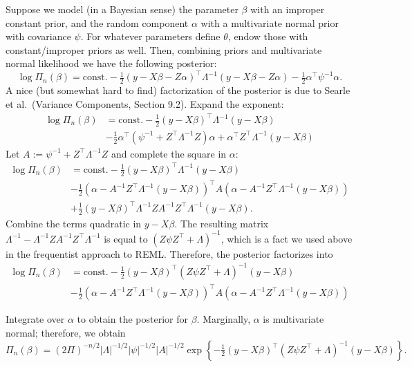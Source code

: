 \documentclass[
]{book}
\begin{document}
Suppose we model (in a Bayesian sense) the parameter \(\beta\) with an improper constant prior, and the random component \(\alpha\) with a multivariate normal prior with covariance \(\psi\). For whatever parameters define \(\theta\), endow those with constant/improper priors as well. Then, combining priors and multivariate normal likelihood we have the following posterior:
\[\log\Pi_n(\beta) = \text{const.} - \tfrac12 \left(y - X\beta - Z\alpha\right)^\top \Lambda^{-1}\left(y - X\beta - Z\alpha\right) - \tfrac12\alpha^\top \psi^{-1}\alpha . \]
A nice (but somewhat hard to find) factorization of the posterior is due to Searle et al.~(Variance Components, Section 9.2). Expand the exponent:
\begin{align*}
\log\Pi_n(\beta) &= \text{const.} - \tfrac12 \left(y - X\beta\right)^\top \Lambda^{-1}\left(y - X\beta\right)\\
&-\tfrac12 \alpha^\top (\psi^{-1} + Z^\top \Lambda^{-1}Z)\alpha + \alpha^\top Z^\top \Lambda^{-1}(y - X\beta)
\end{align*}
Let \(A:=\psi^{-1} + Z^\top \Lambda^{-1}Z\) and complete the square in \(\alpha\):
\begin{align*}
\log\Pi_n(\beta) &= \text{const.} - \tfrac12 \left(y - X\beta\right)^\top \Lambda^{-1}\left(y - X\beta\right)\\
&-\tfrac12(\alpha - A^{-1}Z^\top\Lambda^{-1}(y-X\beta))^\top A(\alpha - A^{-1}Z^\top\Lambda^{-1}(y-X\beta))\\
&+\tfrac12(y-X\beta)^\top\Lambda^{-1}ZA^{-1}Z^\top \Lambda^{-1} (y-X\beta). 
\end{align*}
Combine the terms quadratic in \(y-X\beta\). The resulting matrix \(\Lambda^{-1} - \Lambda^{-1}ZA^{-1}Z^\top \Lambda^{-1}\) is equal to \((Z\psi Z^\top + \Lambda)^{-1}\), which is a fact we used above in the frequentist approach to REML. Therefore, the posterior factorizes into
\begin{equation}
\label{eq:preddist}
\begin{aligned}
\log\Pi_n(\beta) &= \text{const.} - \tfrac12 \left(y - X\beta\right)^\top (Z\psi Z^\top +\Lambda)^{-1}(y - X\beta) \\
&- \tfrac12(\alpha - A^{-1}Z^\top\Lambda^{-1}(y-X\beta))^\top A(\alpha - A^{-1}Z^\top\Lambda^{-1}(y-X\beta)) 
\end{aligned}
\end{equation}

Integrate over \(\alpha\) to obtain the posterior for \(\beta\). Marginally, \(\alpha\) is multivariate normal; therefore, we obtain
\[\Pi_n(\beta) = (2\Pi)^{-n/2}|\Lambda|^{-1/2}|\psi|^{-1/2}|A|^{-1/2}\exp\left\{-\tfrac12 \left(y - X\beta\right)^\top (Z\psi Z^\top +\Lambda)^{-1}(y - X\beta)\right\}.\]
\end{document}
